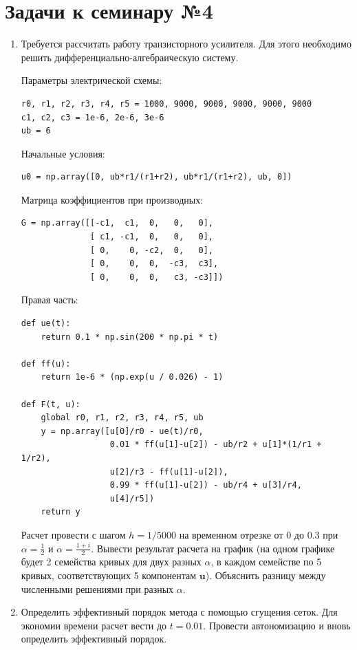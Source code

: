 \documentclass{article}
\begin{document}
\section*{Задачи к семинару №4}
\begin{enumerate}
\item Требуется рассчитать работу транзисторного усилителя. Для этого необходимо решить дифференциально-алгебраическую систему.

Параметры электрической схемы:
\begin{verbatim}
r0, r1, r2, r3, r4, r5 = 1000, 9000, 9000, 9000, 9000, 9000
c1, c2, c3 = 1e-6, 2e-6, 3e-6
ub = 6
\end{verbatim}
Начальные условия:
\begin{verbatim}
u0 = np.array([0, ub*r1/(r1+r2), ub*r1/(r1+r2), ub, 0])
\end{verbatim}
Матрица коэффициентов при производных:
\begin{verbatim}
G = np.array([[-c1,  c1,  0,   0,   0],
              [ c1, -c1,  0,   0,   0],
              [ 0,    0, -c2,  0,   0],
              [ 0,    0,  0,  -c3,  c3],
              [ 0,    0,  0,   c3, -c3]])
\end{verbatim}
Правая часть:
\begin{verbatim}
def ue(t):
    return 0.1 * np.sin(200 * np.pi * t)

def ff(u):
    return 1e-6 * (np.exp(u / 0.026) - 1)

def F(t, u):
    global r0, r1, r2, r3, r4, r5, ub
    y = np.array([u[0]/r0 - ue(t)/r0,
                  0.01 * ff(u[1]-u[2]) - ub/r2 + u[1]*(1/r1 + 1/r2),
                  u[2]/r3 - ff(u[1]-u[2]),
                  0.99 * ff(u[1]-u[2]) - ub/r4 + u[3]/r4,
                  u[4]/r5])
    return y
\end{verbatim}
Расчет провести с шагом $h = 1/5000$ на временном отрезке от 0 до 0.3 при $\alpha = \frac{1}{2}$ и $\alpha = \frac{1+i}{2}$. Вывести результат расчета на график (на одном графике будет 2 семейства кривых для двух разных $\alpha$, в каждом семействе по 5 кривых, соответствующих 5 компонентам $\mathbf{u}$). Объяснить разницу между численными решениями при разных $\alpha$.
\item Определить  эффективный порядок метода с помощью сгущения сеток. Для экономии времени расчет вести до $t = 0.01$. Провести автономизацию и вновь определить эффективный порядок.
\end{enumerate}
\end{document}
